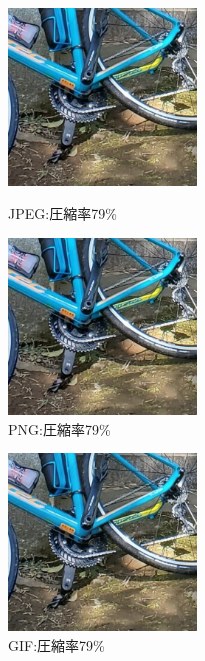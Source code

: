 \documentclass[a4paper,11pt]{bxjsarticle}
\begin{document}
    \begin{figure}[htbp]
      \begin{minipage}{0.5\hsize}
       \begin{center}
        \includegraphics[width=50mm]{sample_j79.eps}
       \end{center}
       \caption{JPEG:圧縮率79\%}
       \label{fig:j79}
      \end{minipage}
      \begin{minipage}{0.5\hsize}
       \begin{center}
        \includegraphics[width=50mm]{sample_p79.eps}
       \end{center}
       \caption{PNG:圧縮率79\%}
       \label{fig:p79}
      \end{minipage}
     \end{figure}

     \begin{figure}[!htbp]
       \begin{center}
        \includegraphics[width=50mm]{sample_g79.eps}
       \end{center}
       \caption{GIF:圧縮率79\%}
       \label{fig:g79}
     \end{figure}
\end{document}

